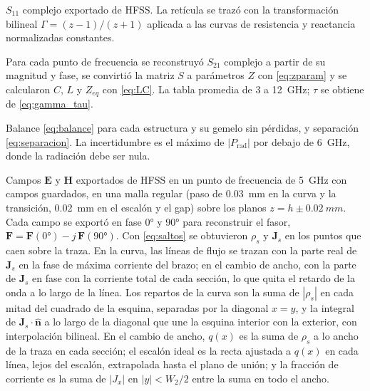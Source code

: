 \documentclass[11pt,letterpaper]{article}
\begin{document}
\begin{description}[style=nextline,leftmargin=0pt,itemsep=4pt,font=\normalfont\bfseries]
\item[Figura~\ref{fig:smith} (carta de Smith)] $S_{11}$ complejo exportado de HFSS. La retícula se trazó con la transformación bilineal $\Gamma=(z-1)/(z+1)$ aplicada a las curvas de resistencia y reactancia normalizadas constantes.

\item[Figura~\ref{fig:lc} y Tabla~\ref{tab:lc} (circuito de la curva)] Para cada punto de frecuencia se reconstruyó $S_{21}$ complejo a partir de su magnitud y fase, se convirtió la matriz $S$ a parámetros $Z$ con \eqref{eq:zparam} y se calcularon $C$, $L$ y $Z_{eq}$ con \eqref{eq:LC}. La tabla promedia de 3 a \SI{12}{GHz}; $\tau$ se obtiene de \eqref{eq:gamma_tau}.

\item[Figura~\ref{fig:rad} y Tabla~\ref{tab:potencia} (potencia en la curva)] Balance \eqref{eq:balance} para cada estructura y su gemelo sin pérdidas, y separación \eqref{eq:separacion}. La incertidumbre es el máximo de $|P_{\mathrm{rad}}|$ por debajo de \SI{6}{GHz}, donde la radiación debe ser nula.

\item[Figuras~\ref{fig:carga}, \ref{fig:dcarga} y~\ref{fig:d3campos} (carga y corriente)] Campos $\mathbf{E}$ y $\mathbf{H}$ exportados de HFSS en un punto de frecuencia de \SI{5}{GHz} con campos guardados, en una malla regular (paso de \SI{0.03}{mm} en la curva y la transición, \SI{0.02}{mm} en el escalón y el gap) sobre los planos $z=h\pm\SI{0.02}{mm}$. Cada campo se exportó en fase \ang{0} y \ang{90} para reconstruir el fasor, $\mathbf{F}=\mathbf{F}(\ang{0})-j\,\mathbf{F}(\ang{90})$. Con \eqref{eq:saltos} se obtuvieron $\rho_s$ y $\mathbf{J}_s$ en los puntos que caen sobre la traza. En la curva, las líneas de flujo se trazan con la parte real de $\mathbf{J}_s$ en la fase de máxima corriente del brazo; en el cambio de ancho, con la parte de $\mathbf{J}_s$ en fase con la corriente total de cada sección, lo que quita el retardo de la onda a lo largo de la línea. Los repartos de la curva son la suma de $|\rho_s|$ en cada mitad del cuadrado de la esquina, separadas por la diagonal $x=y$, y la integral de $\mathbf{J}_s\cdot\hat{\mathbf{n}}$ a lo largo de la diagonal que une la esquina interior con la exterior, con interpolación bilineal. En el cambio de ancho, $q(x)$ es la suma de $\rho_s$ a lo ancho de la traza en cada sección; el escalón ideal es la recta ajustada a $q(x)$ en cada línea, lejos del escalón, extrapolada hasta el plano de unión; y la fracción de corriente es la suma de $|J_x|$ en $|y|<W_2/2$ entre la suma en todo el ancho.


\end{description}
\end{document}
